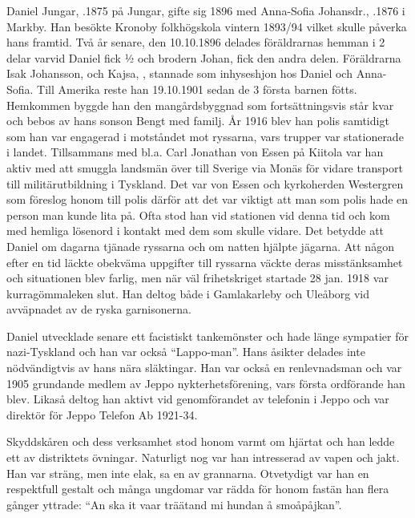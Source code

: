 Daniel Jungar, .1875 på Jungar, gifte sig 1896 med Anna-Sofia Johansdr., .1876 i Markby. Han besökte Kronoby folkhögskola vintern 1893/94 vilket skulle påverka hans framtid. Två år senare, den 10.10.1896 delades föräldrarnas hemman i 2 delar varvid Daniel fick ½ och brodern Johan,  fick den andra delen. Föräldrarna Isak Johansson,  och Kajsa, , stannade som inhyseshjon hos Daniel och Anna-Sofia. Till Amerika reste han 19.10.1901 sedan de 3 första barnen fötts. Hemkommen byggde han den mangårdsbyggnad som fortsättningsvis står kvar och bebos av hans sonson Bengt med familj.
År 1916 blev han polis samtidigt som han var engagerad i motståndet mot ryssarna, vars trupper var stationerade i landet. Tillsammans med bl.a. Carl Jonathan von Essen på Kiitola var han aktiv med att smuggla landsmän över till Sverige via Monäs för vidare transport till militärutbildning i Tyskland. Det var von Essen och kyrkoherden Westergren som föreslog honom till polis därför att det var viktigt att man som polis hade en person man kunde lita på. Ofta stod han vid stationen vid denna tid och kom med hemliga lösenord i kontakt med dem som skulle vidare. Det betydde att Daniel om dagarna tjänade ryssarna och om natten hjälpte jägarna. Att någon efter en tid läckte obekväma uppgifter till ryssarna väckte deras misstänksamhet och situationen blev farlig, men när väl frihetskriget startade 28 jan. 1918 var kurragömmaleken slut. Han deltog både i Gamlakarleby och Uleåborg vid avväpnadet av de ryska garnisonerna.

Daniel utvecklade senare ett facistiskt tankemönster och hade länge sympatier för nazi-Tyskland och han var också ``Lappo-man''. Hans åsikter delades inte nödvändigtvis av hans nära släktingar. Han var också en renlevnadsman och var 1905 grundande medlem av Jeppo nykterhetsförening, vars första ordförande han blev. Likaså deltog han aktivt vid genomförandet av telefonin i Jeppo  och var direktör för Jeppo Telefon Ab 1921-34.

Skyddskåren och dess verksamhet stod honom varmt om hjärtat och han ledde ett av distriktets övningar. Naturligt nog var han intresserad av vapen och jakt. Han var sträng, men inte elak, sa en av grannarna. Otvetydigt var han en respektfull gestalt och många ungdomar var rädda för honom fastän han flera gånger yttrade: ``An ska it vaar träätand mi hundan å smoåpåjkan''.

